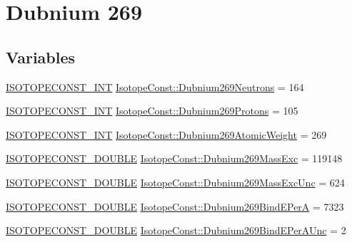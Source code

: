 \hypertarget{group___isotope_const-_dubnium-_db269}{}\section{Dubnium 269}
\label{group___isotope_const-_dubnium-_db269}
\subsection*{Variables}
\begin{DoxyCompactItemize}
\item 
\mbox{\hyperlink{group___isotope_const-_macros_ga5f18360b3e99483a35c32d789e62621c}{I\+S\+O\+T\+O\+P\+E\+C\+O\+N\+S\+T\+\_\+\+I\+NT}} \mbox{\hyperlink{group___isotope_const-_dubnium-_db269_ga68277438e2c94fc0123697689a5fde04}{Isotope\+Const\+::\+Dubnium269\+Neutrons}} = 164
\item 
\mbox{\hyperlink{group___isotope_const-_macros_ga5f18360b3e99483a35c32d789e62621c}{I\+S\+O\+T\+O\+P\+E\+C\+O\+N\+S\+T\+\_\+\+I\+NT}} \mbox{\hyperlink{group___isotope_const-_dubnium-_db269_ga8fef3b0450136d0c650baebd3ac97f0e}{Isotope\+Const\+::\+Dubnium269\+Protons}} = 105
\item 
\mbox{\hyperlink{group___isotope_const-_macros_ga5f18360b3e99483a35c32d789e62621c}{I\+S\+O\+T\+O\+P\+E\+C\+O\+N\+S\+T\+\_\+\+I\+NT}} \mbox{\hyperlink{group___isotope_const-_dubnium-_db269_ga39bce6ddb6a52601b01d30bbdb497aeb}{Isotope\+Const\+::\+Dubnium269\+Atomic\+Weight}} = 269
\item 
\mbox{\hyperlink{group___isotope_const-_macros_ga8f45a7272ce02c0b4c65c44636ed719a}{I\+S\+O\+T\+O\+P\+E\+C\+O\+N\+S\+T\+\_\+\+D\+O\+U\+B\+LE}} \mbox{\hyperlink{group___isotope_const-_dubnium-_db269_gab05fbbbc50221770b6b657897e3211bd}{Isotope\+Const\+::\+Dubnium269\+Mass\+Exc}} = 119148
\item 
\mbox{\hyperlink{group___isotope_const-_macros_ga8f45a7272ce02c0b4c65c44636ed719a}{I\+S\+O\+T\+O\+P\+E\+C\+O\+N\+S\+T\+\_\+\+D\+O\+U\+B\+LE}} \mbox{\hyperlink{group___isotope_const-_dubnium-_db269_gab183fe6ee8292edc105e0d19fc47d3ac}{Isotope\+Const\+::\+Dubnium269\+Mass\+Exc\+Unc}} = 624
\item 
\mbox{\hyperlink{group___isotope_const-_macros_ga8f45a7272ce02c0b4c65c44636ed719a}{I\+S\+O\+T\+O\+P\+E\+C\+O\+N\+S\+T\+\_\+\+D\+O\+U\+B\+LE}} \mbox{\hyperlink{group___isotope_const-_dubnium-_db269_ga29adc972dfe1789903fe0267b0b197b4}{Isotope\+Const\+::\+Dubnium269\+Bind\+E\+PerA}} = 7323
\item 
\mbox{\hyperlink{group___isotope_const-_macros_ga8f45a7272ce02c0b4c65c44636ed719a}{I\+S\+O\+T\+O\+P\+E\+C\+O\+N\+S\+T\+\_\+\+D\+O\+U\+B\+LE}} \mbox{\hyperlink{group___isotope_const-_dubnium-_db269_ga0f7ea1ae0f6be7b713823ce9ec6782a8}{Isotope\+Const\+::\+Dubnium269\+Bind\+E\+Per\+A\+Unc}} = 2

\end{DoxyCompactItemize}
